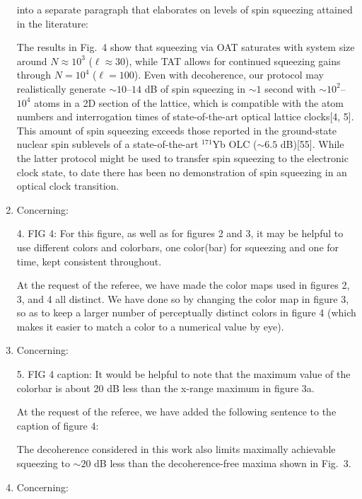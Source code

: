\documentclass[preprint,superscriptaddress]{revtex4-2}
\newcommand{\blue}[1]{{\color{blue} #1}}
\newcommand{\green}[1]{{\color{ForestGreen} #1}}
\begin{document}
\begin{enumerate}
  into a separate paragraph that elaborates on levels of spin
  squeezing attained in the literature:

  \green{The results in Fig.~4 show that squeezing via OAT saturates
    with system size around $N\approx10^3$ ($\ell\approx30$), while
    TAT allows for continued squeezing gains through $N=10^4$
    ($\ell=100$).  Even with decoherence, our protocol may
    realistically generate $\sim10$--$14$ dB of spin squeezing in
    $\sim1$ second with $\sim10^2$--$10^4$ atoms in a 2D section of
    the lattice, which is compatible with the atom numbers and
    interrogation times of state-of-the-art optical lattice clocks[4,
    5].  This amount of spin squeezing exceeds those reported in the
    ground-state nuclear spin sublevels of a state-of-the-art
    ${}^{171}$Yb OLC ($\sim6.5$ dB)[55].  While the latter protocol
    might be used to transfer spin squeezing to the electronic clock
    state, to date there has been no demonstration of spin squeezing
    in an optical clock transition.}

\item Concerning:

  \blue{4. FIG 4: For this figure, as well as for figures 2 and 3, it
    may be helpful to use different colors and colorbars, one
    color(bar) for squeezing and one for time, kept consistent
    throughout.}

  At the request of the referee, we have made the color maps used in
  figures 2, 3, and 4 all distinct.  We have done so by changing the
  color map in figure 3, so as to keep a larger number of perceptually
  distinct colors in figure 4 (which makes it easier to match a color
  to a numerical value by eye).

\item Concerning:

  \blue{5. FIG 4 caption: It would be helpful to note that the maximum
    value of the colorbar is about 20 dB less than the x-range maximum
    in figure 3a.}

  At the request of the referee, we have added the following sentence
  to the caption of figure 4:

  \green{The decoherence considered in this work also limits maximally
    achievable squeezing to $\sim20$ dB less than the decoherence-free
    maxima shown in Fig.~3.}

\item Concerning:


\end{enumerate}
\end{document}

